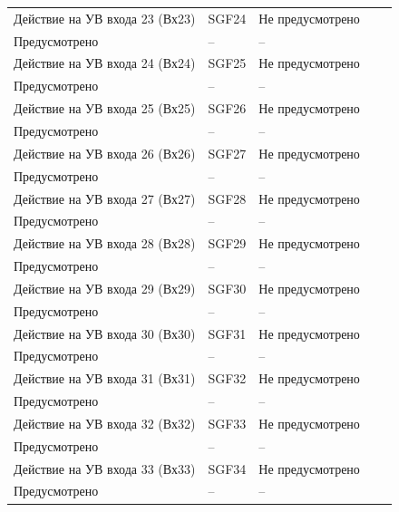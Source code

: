 \begin{longtable}{|>{\centering\arraybackslash}m{5.3cm}|>{\centering\arraybackslash}m{3.3cm}|>{\centering\arraybackslash}m{4.2cm}|>{\centering\arraybackslash}m{1.8cm}|>{\centering\arraybackslash}m{1cm}|}
\hline
\centering Действие на УВ входа 23 (Вх23)  & \centering SGF24 & \centering Не предусмотрено \\ Предусмотрено & \centering -- & \centering \arraybackslash -- \\
\hline
\centering Действие на УВ входа 24 (Вх24)  & \centering SGF25 & \centering Не предусмотрено \\ Предусмотрено & \centering -- & \centering \arraybackslash -- \\
\hline
\centering Действие на УВ входа 25 (Вх25)  & \centering SGF26 & \centering Не предусмотрено \\ Предусмотрено & \centering -- & \centering \arraybackslash -- \\
\hline
\centering Действие на УВ входа 26 (Вх26)  & \centering SGF27 & \centering Не предусмотрено \\ Предусмотрено & \centering -- & \centering \arraybackslash -- \\
\hline
\centering Действие на УВ входа 27 (Вх27)  & \centering SGF28 & \centering Не предусмотрено \\ Предусмотрено & \centering -- & \centering \arraybackslash -- \\
\hline
\centering Действие на УВ входа 28 (Вх28)  & \centering SGF29 & \centering Не предусмотрено \\ Предусмотрено & \centering -- & \centering \arraybackslash -- \\
\hline
\centering Действие на УВ входа 29 (Вх29)  & \centering SGF30 & \centering Не предусмотрено \\ Предусмотрено & \centering -- & \centering \arraybackslash -- \\
\hline
\centering Действие на УВ входа 30 (Вх30)  & \centering SGF31 & \centering Не предусмотрено \\ Предусмотрено & \centering -- & \centering \arraybackslash -- \\
\hline
\centering Действие на УВ входа 31 (Вх31)  & \centering SGF32 & \centering Не предусмотрено \\ Предусмотрено & \centering -- & \centering \arraybackslash -- \\
\hline
\centering Действие на УВ входа 32 (Вх32)  & \centering SGF33 & \centering Не предусмотрено \\ Предусмотрено & \centering -- & \centering \arraybackslash -- \\
\hline
\centering Действие на УВ входа 33 (Вх33)  & \centering SGF34 & \centering Не предусмотрено \\ Предусмотрено & \centering -- & \centering \arraybackslash -- \\

\end{longtable}
